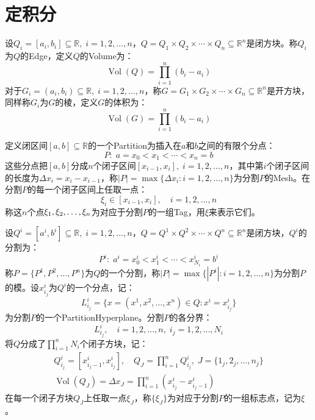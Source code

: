 \section{定积分}
\begin{definition}
	设$Q_i=[a_i,b_i]\subseteq\mathbb{R},\;i=1,2,\dots,n$，$Q=Q_1\times Q_2\times\cdots\times Q_n\subseteq\mathbb{R}^{n}$是闭方块。称$Q_i$为$Q$的\gls{Edge}，定义$Q$的\gls{Volume}为：
	\begin{equation*}
		\operatorname{Vol}(Q)=\prod_{i=1}^{n}(b_i-a_i)
	\end{equation*}
	对于$G_i=(a_i,b_i)\subseteq\mathbb{R},\;i=1,2,\dots,n$，称$G=G_1\times G_2\times\cdots\times G_n\subseteq\mathbb{R}^{n}$是开方块，同样称$G_i$为$G$的棱，定义$G$的体积为：
	\begin{equation*}
		\operatorname{Vol}(G)=\prod_{i=1}^{n}(b_i-a_i)
	\end{equation*}
\end{definition}
\begin{definition}
	定义闭区间$[a,b]\subseteq\mathbb{R}$的一个\gls{Partition}为插入在$a$和$b$之间的有限个分点：
	\begin{equation*}
		P:\;a=x_0<x_1<\cdots<x_n=b
	\end{equation*}
	这些分点把$[a,b]$分成$n$个闭子区间$[x_{i-1},x_{i}],\;i=1,2,\dots,n$，其中第$i$个闭子区间的长度为$\Delta x_i=x_i-x_{i-1}$，称$|P|=\max\{\Delta x_i:i=1,2,\dots,n\}$为分割$P$的\gls{Mesh}。在分割$P$的每一个闭子区间上任取一点：
	\begin{equation*}
		\xi_i\in[x_{i-1},x_i],\quad i=1,2,\dots,n
	\end{equation*}
	称这$n$个点$\xi_1, \xi_2, \dots, \xi_{n}$为对应于分割$P$的一组\gls{Tag}，用$\xi$来表示它们。
\end{definition}
\begin{definition}
	设$Q^i=[a^i,b^i]\subseteq\mathbb{R},\;i=1,2,\dots,n$，$Q=Q^1\times Q^2\times\cdots\times Q^n\subseteq\mathbb{R}^{n}$是闭方块，$Q^i$的分割为：
	\begin{equation*}
		P^i:\;a^i=x_0^i<x_1^i<\cdots<x_{N_i}^i=b^i
	\end{equation*}
	称$P=\{P^1,P^2,\dots,P^n\}$为$Q$的一个分割，称$|P|=\max\{|P^i|:i=1,2,\dots,n\}$为分割$P$的模。设$x_{i_j}^i$为$Q^i$的一个分点，记：
	\begin{equation*}
		L_{i_j}^i=\{x=(x^1,x^2,\dots,x^n)\in Q:x^i=x^i_{i_j}\}
	\end{equation*}
	为分割$P$的一个\gls{PartitionHyperplane}。分割$P$的各分界：
	\begin{equation*}
		L_{i_j}^i,\quad i=1,2,\dots,n,\;i_j=1,2,\dots,N_i
	\end{equation*}
	将$Q$分成了$\prod\limits_{i=1}^{n}N_i$个闭子方块，记：
	\begin{gather*}
		Q_{i_j}^i=[x_{i_j-1}^i,x_{i_j}^i],\quad Q_J=\prod_{i=1}^{n}Q_{i_j}^i,\;J=\{1_j,2_j,\dots,n_j\} \\
		\operatorname{Vol}(Q_J)=\Delta x_J=\prod_{i=1}^{n}(x_{i_j}^i-x_{i_j-1}^i)
	\end{gather*}
	在每一个闭子方块$Q_J$上任取一点$\xi_J$，称$\{\xi_J\}$为对应于分割$P$的一组标志点，记为$\xi$。
\end{definition}
